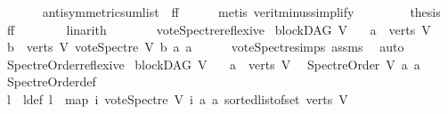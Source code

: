 \begin{isabellebody}
\ \ \ \ \isamarkupfalse%
\ \ antisymmetric{\isacharunderscore}{\kern0pt}sumlist\ {}\ ff{}\isanewline
\ \ \ \ \isamarkupfalse%
\ {\isacharparenleft}{\kern0pt}metis\ verit{\isacharunderscore}{\kern0pt}minus{\isacharunderscore}{\kern0pt}simplify{\isacharparenleft}{\kern0pt}{}{\isacharparenright}{\kern0pt}{\isacharparenright}{\kern0pt}\ \isanewline
\ \ \ \ \isamarkupfalse%
\ \isamarkupfalse%
\ {\isacharquery}{\kern0pt}thesis\ \isamarkupfalse%
\ ff\isanewline
\ \ \ \ \ \ \isamarkupfalse%
\ linarith\ \isanewline
\ \ \isamarkupfalse%
\ \ \isanewline
{}\isamarkupfalse%
%
\endisatagproof
{\isafoldproof}%
%
\isadelimproof
\isanewline
%
\endisadelimproof
\isanewline
\isanewline
{}\isamarkupfalse%
\ vote{\isacharunderscore}{\kern0pt}Spectre{\isacharunderscore}{\kern0pt}reflexive{\isacharcolon}{\kern0pt}\isanewline
{}\ {\isachardoublequoteopen}blockDAG\ V{\isachardoublequoteclose}\isanewline
\ \ \ {\isachardoublequoteopen}a\ {\isasymin}\ verts\ V{\isachardoublequoteclose}\isanewline
{}\ {\isachardoublequoteopen}{\isasymforall}b\ {\isasymin}\ verts\ V{\isachardot}{\kern0pt}\ vote{\isacharunderscore}{\kern0pt}Spectre\ V\ b\ a\ a\ {\isacharequal}{\kern0pt}\ {}\ {\isachardoublequoteclose}%
\isadelimproof
\ %
\endisadelimproof
%
\isatagproof
{}\isamarkupfalse%
\ vote{\isacharunderscore}{\kern0pt}Spectre{\isachardot}{\kern0pt}simps\ assms\ \isamarkupfalse%
\ auto%
\endisatagproof
{\isafoldproof}%
%
\isadelimproof
%
\endisadelimproof
\ \isanewline
\isanewline
{}\isamarkupfalse%
\ Spectre{\isacharunderscore}{\kern0pt}Order{\isacharunderscore}{\kern0pt}reflexive{\isacharcolon}{\kern0pt}\isanewline
{}\ {\isachardoublequoteopen}blockDAG\ V{\isachardoublequoteclose}\isanewline
\ \ \ {\isachardoublequoteopen}a\ {\isasymin}\ verts\ V{\isachardoublequoteclose}\ \isanewline
{}\ {\isachardoublequoteopen}Spectre{\isacharunderscore}{\kern0pt}Order\ V\ a\ a{\isachardoublequoteclose}\ \isanewline
%
\isadelimproof
\ \ %
\endisadelimproof
%
\isatagproof
{}\isamarkupfalse%
\ Spectre{\isacharunderscore}{\kern0pt}Order{\isacharunderscore}{\kern0pt}def\ \isanewline
{}\isamarkupfalse%
\ {\isacharminus}{\kern0pt}\ \ \ \isanewline
\ \ \isamarkupfalse%
\ l\ \ l{\isacharunderscore}{\kern0pt}def{\isacharcolon}{\kern0pt}\ {\isachardoublequoteopen}l\ {\isacharequal}{\kern0pt}\ {\isacharparenleft}{\kern0pt}map\ {\isacharparenleft}{\kern0pt}{\isasymlambda}i{\isachardot}{\kern0pt}\ vote{\isacharunderscore}{\kern0pt}Spectre\ V\ i\ a\ a{\isacharparenright}{\kern0pt}\ {\isacharparenleft}{\kern0pt}sorted{\isacharunderscore}{\kern0pt}list{\isacharunderscore}{\kern0pt}of{\isacharunderscore}{\kern0pt}set\ {\isacharparenleft}{\kern0pt}verts\ V{\isacharparenright}{\kern0pt}{\isacharparenright}{\kern0pt}{\isacharparenright}{\kern0pt}{\isachardoublequoteclose}\isanewline

\end{isabellebody}
